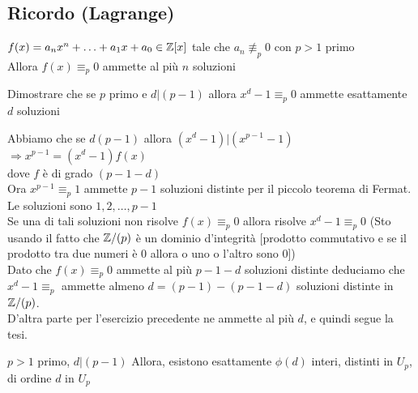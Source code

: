 \documentclass[12px]{article}
\begin{document}
	\subsection{Ricordo (Lagrange)}
	$f(x) = a_nx^n + \ldots + a_1 x + a_0\in \mathbb{Z}[x]$ tale che $a_n \not\equiv_p 0$ con  $p > 1$ primo \\
	Allora  $f(x)\equiv_p 0$ ammette al più  $n$ soluzioni
	\begin{coro}
	Dimostrare che se $p$ primo e $d | (p-1)$ allora  $x^d -1 \equiv_p 0$ ammette esattamente  $d $ soluzioni
\end{coro}
\begin{dimo}[Soluzione]
	Abbiamo che se $d  (p-1)$ allora $(x^d -1) | (x^{p-1} - 1)$\\
	$  \Rightarrow x^{p-1} = (x^d-1)f(x)$\\
	dove $f$ è di grado $(p-1-d)$ \\
	Ora  $x^{p-1}\equiv_p 1$ ammette  $p-1$ soluzioni distinte per il piccolo teorema di Fermat. Le soluzioni sono  $1,2,\ldots, p-1$\\
	Se una di tali soluzioni non risolve  $f(x)\equiv_p 0$ allora risolve  $x^d-1\equiv_p 0$ (Sto usando il fatto che  $\mathbb{Z}/(p)$ è un dominio d'integrità [prodotto commutativo e se il prodotto tra due numeri è 0 allora o uno o l'altro sono 0])\\
	Dato che $ f(x)\equiv_p 0$ ammette al più $p-1-d$ soluzioni distinte deduciamo che $x^d - 1\equiv_p$ ammette almeno $d = (p-1)-(p-1-d)$ soluzioni distinte in  $\mathbb{Z}/(p)$.\\
	D'altra parte per l'esercizio precedente ne ammette al più $d$, e quindi segue la tesi.
\end{dimo}
\begin{coro}[Esercizio]
	$p> 1$ primo, $d | (p-1)$ Allora, esistono esattamente $\phi(d)$ interi, distinti in $U_p$, di ordine $d$ in $U_p$
\end{coro}
\end{document}
